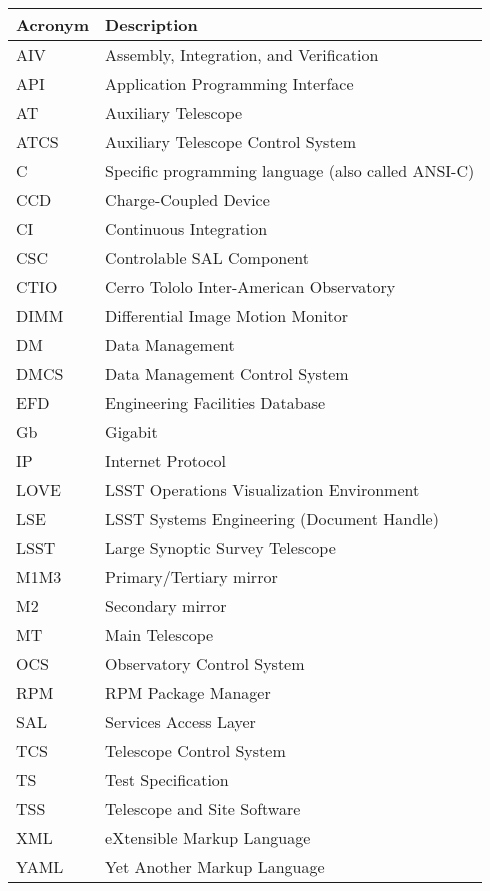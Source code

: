 \addtocounter{table}{-1}
\begin{longtable}{|l|p{}|}\hline
\textbf{Acronym} & \textbf{Description}  \\\hline

AIV & Assembly, Integration, and Verification \\\hline
API & Application Programming Interface \\\hline
AT & Auxiliary Telescope \\\hline
ATCS & Auxiliary Telescope Control System \\\hline
C & Specific programming language (also called ANSI-C) \\\hline
CCD & Charge-Coupled Device \\\hline
CI & Continuous Integration \\\hline
CSC & Controlable SAL Component \\\hline
CTIO & Cerro Tololo Inter-American Observatory \\\hline
DIMM & Differential Image Motion Monitor \\\hline
DM & Data Management \\\hline
DMCS & Data Management Control System \\\hline
EFD & Engineering Facilities Database \\\hline
Gb & Gigabit \\\hline
IP & Internet Protocol \\\hline
LOVE & LSST Operations Visualization Environment \\\hline
LSE & LSST Systems Engineering (Document Handle) \\\hline
LSST & Large Synoptic Survey Telescope \\\hline
M1M3 & Primary/Tertiary mirror \\\hline
M2 & Secondary mirror \\\hline
MT & Main Telescope \\\hline
OCS & Observatory Control System \\\hline
RPM & RPM Package Manager \\\hline
SAL & Services Access Layer \\\hline
TCS & Telescope Control System \\\hline
TS & Test Specification \\\hline
TSS & Telescope and Site Software \\\hline
XML & eXtensible Markup Language \\\hline
YAML & Yet Another Markup Language \\\hline
\end{longtable}
